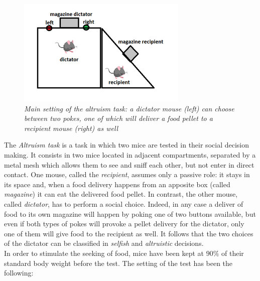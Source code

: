 \documentclass[a4paper]{article}
\begin{document}
\begin{figure}[H]
	\begin{center}
		\includegraphics[scale=1.1]{altruism.png} 
	\end{center} 
	\caption{\textit{Main setting of the altruism task: a dictator mouse (left) can choose between two pokes, one of which will deliver a food pellet to a recipient mouse (right) as well}}
	
\end{figure}

The \textit{Altruism task} is a task in which two mice are tested in their social decision making. It consists in two mice located in adjacent compartments, separated by a metal mesh which allows them to see and sniff each other, but not enter in direct contact. One mouse, called the \textit{recipient}, assumes only a passive role: it stays in its space and, when a food delivery happens from an apposite box (called \textit{magazine}) it can eat the delivered food pellet. 
In contrast, the other mouse, called \textit{dictator}, has to perform a social choice. Indeed, in any case a deliver of food to its own magazine will happen by poking one of two buttons available, but even if both types of pokes will provoke a pellet delivery for the dictator, only one of them will give food to the recipient as well. It follows that the two choices of the dictator can be classified in \textit{selfish} and \textit{altruistic} decisions.\\
In order to stimulate the seeking of food, mice have been kept at $ 90 \%$ of their standard body weight before the test. The setting of the test has been the following:
\end{document}
